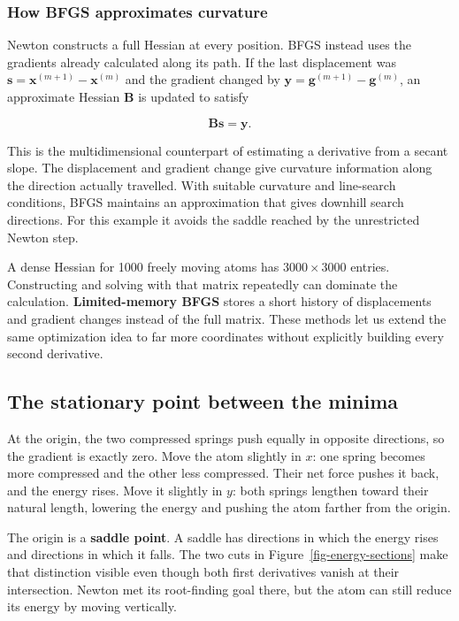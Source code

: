 \documentclass[
  11pt,
  letterpaper,
  DIV=11,
  numbers=noendperiod]{scrartcl}
\begin{document}
\subsubsection{How BFGS approximates
curvature}\label{how-bfgs-approximates-curvature}

Newton constructs a full Hessian at every position. BFGS instead uses
the gradients already calculated along its path. If the last
displacement was \(\mathbf s=\mathbf x^{(m+1)}-\mathbf x^{(m)}\) and the
gradient changed by \(\mathbf y=\mathbf g^{(m+1)}-\mathbf g^{(m)}\), an
approximate Hessian \(\mathbf B\) is updated to satisfy

\[
\mathbf B\mathbf s=\mathbf y.
\]

This is the multidimensional counterpart of estimating a derivative from
a secant slope. The displacement and gradient change give curvature
information along the direction actually travelled. With suitable
curvature and line-search conditions, BFGS maintains an approximation
that gives downhill search directions. For this example it avoids the
saddle reached by the unrestricted Newton step.

A dense Hessian for 1000 freely moving atoms has \(3000\times3000\)
entries. Constructing and solving with that matrix repeatedly can
dominate the calculation. \textbf{Limited-memory BFGS} stores a short
history of displacements and gradient changes instead of the full
matrix. These methods let us extend the same optimization idea to far
more coordinates without explicitly building every second derivative.

\subsection{The stationary point between the
minima}\label{the-stationary-point-between-the-minima}

At the origin, the two compressed springs push equally in opposite
directions, so the gradient is exactly zero. Move the atom slightly in
\(x\): one spring becomes more compressed and the other less compressed.
Their net force pushes it back, and the energy rises. Move it slightly
in \(y\): both springs lengthen toward their natural length, lowering
the energy and pushing the atom farther from the origin.

The origin is a \textbf{saddle point}. A saddle has directions in which
the energy rises and directions in which it falls. The two cuts in
Figure~\ref{fig-energy-sections} make that distinction visible even
though both first derivatives vanish at their intersection. Newton met
its root-finding goal there, but the atom can still reduce its energy by
moving vertically.
\end{document}
